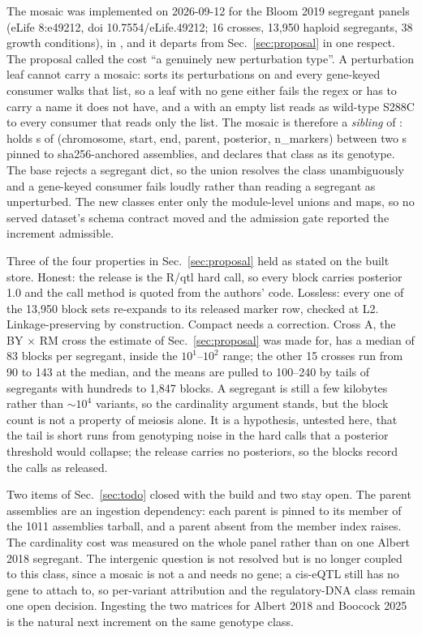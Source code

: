 The mosaic was implemented on 2026-09-12 for the Bloom 2019 segregant panels (eLife
8:e49212, doi 10.7554/eLife.49212; 16 crosses, 13,950 haploid segregants, 38 growth
conditions), in , and it departs from
Sec.~\ref{sec:proposal} in one respect. The proposal called the cost ``a genuinely new
perturbation type''. A perturbation leaf cannot carry a mosaic:  sorts its
perturbations on  and every gene-keyed consumer walks that
list, so a leaf with no gene either fails the regex or has to carry a name it does not
have, and a  with an empty list reads as wild-type S288C to every consumer
that reads only the list. The mosaic is therefore a \emph{sibling} of :
 holds s of (chromosome, start, end, parent,
posterior, n\_markers) between two s pinned to sha256-anchored
assemblies, and  declares that class as its genotype.
The base  rejects a segregant dict, so the union resolves the class
unambiguously and a gene-keyed consumer fails loudly rather than reading a segregant as
unperturbed. The new classes enter only the module-level unions and maps, so no served
dataset's schema contract moved and the admission gate reported the increment admissible.

Three of the four properties in Sec.~\ref{sec:proposal} held as stated on the built
store. Honest: the release is the R/qtl hard call, so every block carries posterior 1.0
and the call method is quoted from the authors' code. Lossless: every one of the 13,950
block sets re-expands to its released marker row, checked at L2. Linkage-preserving by
construction. Compact needs a correction. Cross A, the BY $\times$ RM cross the estimate
of Sec.~\ref{sec:proposal} was made for, has a median of 83 blocks per segregant, inside
the $10^1$--$10^2$ range; the other 15 crosses run from 90 to 143 at the median, and the
means are pulled to 100--240 by tails of segregants with hundreds to 1,847 blocks. A
segregant is still a few kilobytes rather than $\sim10^4$ variants, so the cardinality
argument stands, but the block count is not a property of meiosis alone. It is a
hypothesis, untested here, that the tail is short runs from genotyping noise in the hard
calls that a posterior threshold would collapse; the release carries no posteriors, so the
blocks record the calls as released.

Two items of Sec.~\ref{sec:todo} closed with the build and two stay open. The parent
assemblies are an ingestion dependency: each parent is pinned to its member of the 1011
assemblies tarball, and a parent absent from the member index raises. The cardinality
cost was measured on the whole panel rather than on one Albert 2018 segregant. The
intergenic question is not resolved but is no longer coupled to this class, since a
mosaic is not a  and needs no gene; a cis-eQTL still has no gene
to attach to, so per-variant attribution and the regulatory-DNA class remain one open
decision. Ingesting the two matrices for Albert 2018 and Boocock 2025 is the natural next
increment on the same genotype class.
